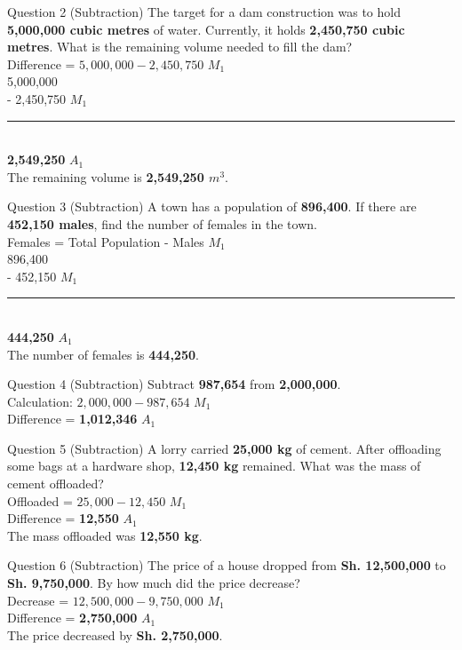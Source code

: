 \documentclass[12pt, a4paper, oneside]{article}
\begin{document}
\begin{solvingbox}{Question 2 (Subtraction)}
The target for a dam construction was to hold \textbf{5,000,000 cubic metres} of water. Currently, it holds \textbf{2,450,750 cubic metres}. What is the remaining volume needed to fill the dam? \\
Difference = $5,000,000 - 2,450,750$ \hfill $M_1$ \\
\phantom{-} 5,000,000 \\
- 2,450,750 \hfill $M_1$ \\
\rule{2.5cm}{0.4pt} \\
\textbf{2,549,250} \hfill $A_1$ \\
The remaining volume is \textbf{2,549,250 $m^3$}.
\end{solvingbox}

\begin{solvingbox}{Question 3 (Subtraction)}
A town has a population of \textbf{896,400}. If there are \textbf{452,150 males}, find the number of females in the town. \\
Females = Total Population - Males \hfill $M_1$ \\
\phantom{-} 896,400 \\
- 452,150 \hfill $M_1$ \\
\rule{2.5cm}{0.4pt} \\
\textbf{444,250} \hfill $A_1$ \\
The number of females is \textbf{444,250}.
\end{solvingbox}

\begin{solvingbox}{Question 4 (Subtraction)}
Subtract \textbf{987,654} from \textbf{2,000,000}. \\
Calculation: $2,000,000 - 987,654$ \hfill $M_1$ \\
Difference = \textbf{1,012,346} \hfill $A_1$
\end{solvingbox}

\begin{solvingbox}{Question 5 (Subtraction)}
A lorry carried \textbf{25,000 kg} of cement. After offloading some bags at a hardware shop, \textbf{12,450 kg} remained. What was the mass of cement offloaded? \\
Offloaded = $25,000 - 12,450$ \hfill $M_1$ \\
Difference = \textbf{12,550} \hfill $A_1$ \\
The mass offloaded was \textbf{12,550 kg}.
\end{solvingbox}

\begin{solvingbox}{Question 6 (Subtraction)}
The price of a house dropped from \textbf{Sh. 12,500,000} to \textbf{Sh. 9,750,000}. By how much did the price decrease? \\
Decrease = $12,500,000 - 9,750,000$ \hfill $M_1$ \\
Difference = \textbf{2,750,000} \hfill $A_1$ \\
The price decreased by \textbf{Sh. 2,750,000}.
\end{solvingbox}
\end{document}
